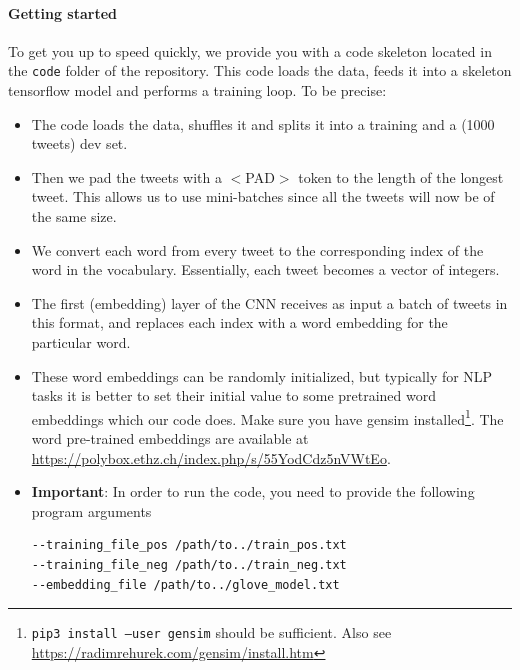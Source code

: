 \documentclass{article}
\begin{document}
\paragraph{Getting started} To get you up to speed quickly, we provide you with a code skeleton located in the \texttt{code} folder of the repository. This code loads the data, feeds it into a skeleton tensorflow model and performs a training loop.  To be precise:
\begin{itemize}
\item The code loads the data, shuffles it and splits it into a training and a (1000 tweets) dev set.
\item Then we pad the tweets with a $<$PAD$>$ token to the length of the longest tweet. This allows us to use mini-batches since all the tweets will now be of the same size.
\item We convert each word from every tweet to the corresponding index of the word in the vocabulary. Essentially, each tweet becomes a vector of integers.
\item 
The first (embedding) layer of the CNN receives as input a batch of tweets in this format, and replaces each index with a word embedding for the particular word.
\item These word embeddings can be randomly initialized, but typically for NLP tasks it is better to set their initial value to some pretrained word embeddings which our code does. Make sure you have gensim installed\footnote{\texttt{pip3 install --user gensim} should be sufficient. Also see \url{https://radimrehurek.com/gensim/install.htm}}. The word pre-trained embeddings are available at \url{https://polybox.ethz.ch/index.php/s/55YodCdz5nVWtEo}.
\item \textbf{Important}: In order to run the code, you need to provide the following program arguments 	
\begin{verbatim}
--training_file_pos /path/to../train_pos.txt
--training_file_neg /path/to../train_neg.txt
--embedding_file /path/to../glove_model.txt
\end{verbatim}
\end{itemize}
\end{document}
